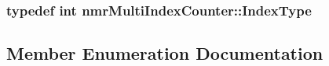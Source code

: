 \subsubsection[{Index\+Type}]{\setlength{\rightskip}{0pt plus 5cm}typedef int {\bf nmr\+Multi\+Index\+Counter\+::\+Index\+Type}}\label{classnmr_multi_index_counter_a0632b941a7d18df347174b4345d73d01}


\subsection{Member Enumeration Documentation}
\hypertarget{classnmr_multi_index_counter_ad7beda3a3ee347140b4b5540770aeba5}{}
